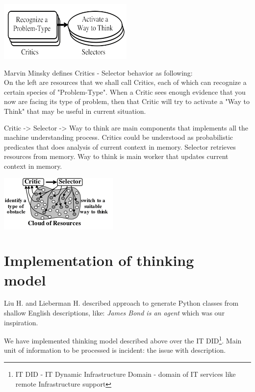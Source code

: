 \documentclass[conference]{IEEEtran}
\begin{document}
\includegraphics{critic_selector_model.png}

Marvin Minsky defines Critics - Selector behavior as following:\\
On the left are resources that we shall call Critics, each of which can recognize a certain species of "Problem-Type". When a Critic sees enough evidence that you now are facing its type of problem, then that Critic will try to activate a "Way to Think" that may be useful in current situation.

Critic -> Selector -> Way to think are main components that implements all the machine understanding process. Critics could be understood as probabilistic predicates that does analysis of current context in memory. Selector retrieves resources from memory. Way to think is main worker that updates current context in memory.

\includegraphics{critic_selector.png}

\section{Implementation of thinking\\ model}

Liu H. and Lieberman H.\cite{stories} described approach to generate Python classes from shallow English descriptions, like: \emph{James Bond is an agent} which was our inspiration.

We have implemented thinking model described above over the IT DID\footnote{IT DID - IT Dynamic Infrastructure Domain - domain of IT services like remote Infrastructure support}. Main unit of information to be processed is incident: the issue with description.
\end{document}
